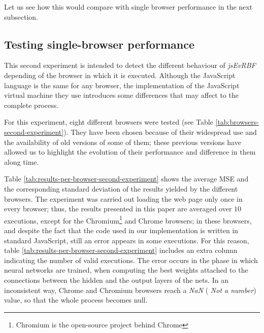\documentclass{article}
\begin{document}
Let us see how this would compare with single browser performance in
the next subsection.



\subsection{Testing single-browser performance}
\label{sec:second-experiment}

This second experiment is intended to detect the different behaviour of {\em jsEvRBF} depending of the browser in which it is executed. Although the JavaScript language is the same for any browser, the implementation of the
JavaScript virtual machine they use introduces some differences that may affect to the complete process.

For this experiment, eight different browsers were tested (see Table
\ref{tab:browsers-second-experiment}). They have been chosen because
of their widespread use and the availability of old
versions of some of them; these previous versions have allowed us to highlight the
evolution of their performance and difference in them along time.

Table \ref{tab:results-per-browser-second-experiment} shows the
average MSE and the corresponding standard deviation of the results
yielded by the different browsers. The experiment was carried out
loading the web page only once in every browser; thus, the results
presented in this paper are averaged over $10$ executions, except for
the Chromium\footnote{Chromium is the open-source project behind Chrome}
 and Chrome browsers; in these browsers, and despite the
fact that the code used in our implementation is written in standard
JavaScript, still an error appears in some executions. %
For this reason, table \ref{tab:results-per-browser-second-experiment}
includes an extra column indicating the number of valid
executions. The error occurs in the phase in which neural networks are
trained, when computing the best weights attached to the connections
between the hidden and the output layers of the nets. In an
inconsistent way, Chrome and Chromium browsers reach a {\em NaN} ({\em
  Not a number}) value, so that the whole process becomes null.  %
\end{document}

